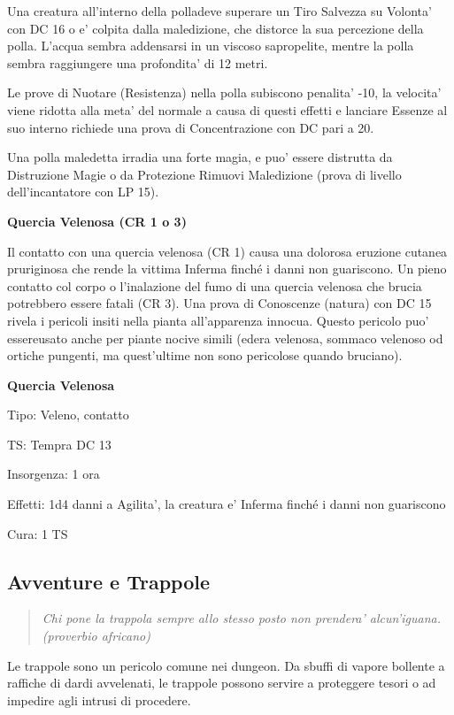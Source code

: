 \documentclass[a4paper,11pt,twoside,openany]{book}
\begin{document}
{Una creatura all'interno della polladeve superare un Tiro Salvezza su Volonta' con DC 16 o e' colpita dalla maledizione, che distorce la sua percezione della polla. L'acqua sembra addensarsi in un viscoso sapropelite, mentre la polla sembra raggiungere una profondita' di 12 metri.

Le prove di Nuotare (Resistenza) nella polla subiscono penalita' -10, la velocita' viene ridotta alla meta' del normale a causa di questi effetti e lanciare Essenze al suo interno richiede una prova di Concentrazione con DC pari a 20.

Una polla maledetta irradia una forte magia, e puo' essere distrutta da Distruzione Magie o da Protezione Rimuovi Maledizione (prova di livello dell'incantatore
con LP 15).

\textbf{Quercia Velenosa (CR 1 o 3)}

Il contatto con una quercia velenosa (CR 1) causa una dolorosa eruzione cutanea pruriginosa che rende la vittima Inferma finché i danni non guariscono. Un pieno contatto col corpo o l'inalazione del fumo di una quercia velenosa che brucia potrebbero essere fatali (CR 3). Una prova di Conoscenze (natura) con DC 15 rivela i pericoli insiti nella pianta all'apparenza innocua. Questo pericolo puo' essereusato anche per piante nocive simili (edera velenosa, sommaco velenoso od ortiche pungenti, ma quest'ultime non sono pericolose quando bruciano).

\textbf{Quercia Velenosa}

Tipo: Veleno, contatto

TS: Tempra DC 13

Insorgenza: 1 ora

Effetti: 1d4 danni a Agilita', la creatura e' Inferma finché i danni
non guariscono

Cura: 1 TS

\pagebreak

\subsection{Avventure e Trappole}

\label{avventure-e-trappole}
\begin{quote}\textit{
Chi pone la trappola sempre allo stesso posto non prendera' alcun'iguana. (proverbio africano)
}\end{quote}

Le trappole sono un pericolo comune nei dungeon. Da sbuffi di vapore bollente a raffiche di dardi avvelenati, le trappole possono servire a proteggere tesori o ad impedire agli intrusi di procedere. 

}
\end{document}
